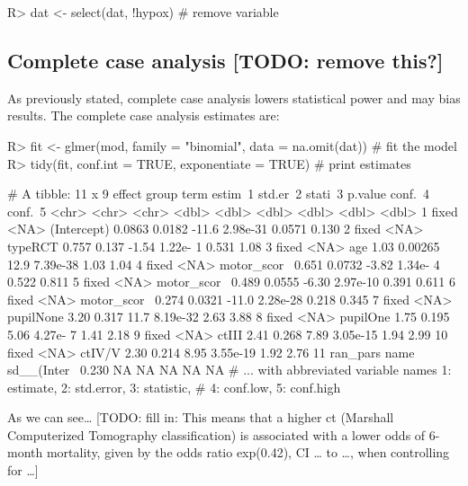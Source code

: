 \documentclass[
]{jss}
\begin{document}
\begin{CodeChunk}
\begin{CodeInput}
R> dat <- select(dat, !hypox)  # remove variable
\end{CodeInput}
\end{CodeChunk}

\hypertarget{complete-case-analysis-todo-remove-this}{%
\subsection{Complete case analysis {[}TODO: remove
this?{]}}\label{complete-case-analysis-todo-remove-this}}

As previously stated, complete case analysis lowers statistical power
and may bias results. The complete case analysis estimates are:

\begin{CodeChunk}
\begin{CodeInput}
R> fit <- glmer(mod, family = "binomial", data = na.omit(dat)) # fit the model
R> tidy(fit, conf.int = TRUE, exponentiate = TRUE)             # print estimates
\end{CodeInput}
\begin{CodeOutput}
# A tibble: 11 x 9
   effect   group term        estim~1 std.er~2 stati~3   p.value conf.~4 conf.~5
   <chr>    <chr> <chr>         <dbl>    <dbl>   <dbl>     <dbl>   <dbl>   <dbl>
 1 fixed    <NA>  (Intercept)  0.0863  0.0182   -11.6   2.98e-31  0.0571   0.130
 2 fixed    <NA>  typeRCT      0.757   0.137     -1.54  1.22e- 1  0.531    1.08 
 3 fixed    <NA>  age          1.03    0.00265   12.9   7.39e-38  1.03     1.04 
 4 fixed    <NA>  motor_scor~  0.651   0.0732    -3.82  1.34e- 4  0.522    0.811
 5 fixed    <NA>  motor_scor~  0.489   0.0555    -6.30  2.97e-10  0.391    0.611
 6 fixed    <NA>  motor_scor~  0.274   0.0321   -11.0   2.28e-28  0.218    0.345
 7 fixed    <NA>  pupilNone    3.20    0.317     11.7   8.19e-32  2.63     3.88 
 8 fixed    <NA>  pupilOne     1.75    0.195      5.06  4.27e- 7  1.41     2.18 
 9 fixed    <NA>  ctIII        2.41    0.268      7.89  3.05e-15  1.94     2.99 
10 fixed    <NA>  ctIV/V       2.30    0.214      8.95  3.55e-19  1.92     2.76 
11 ran_pars name  sd__(Inter~  0.230  NA         NA    NA        NA       NA    
# ... with abbreviated variable names 1: estimate, 2: std.error, 3: statistic,
#   4: conf.low, 5: conf.high
\end{CodeOutput}
\end{CodeChunk}

As we can see\ldots{} {[}TODO: fill in: This means that a higher ct
(Marshall Computerized Tomography classification) is associated with a
lower odds of 6-month mortality, given by the odds ratio exp(0.42), CI
\ldots{} to \ldots, when controlling for \ldots{]}
\end{document}
